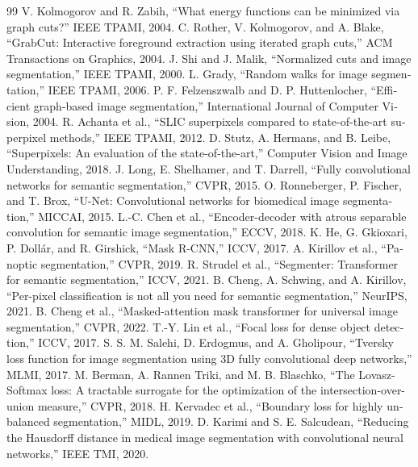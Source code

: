 \documentclass[12pt,openany,oneside]{book}
\begin{document}
\begin{latin}
\begin{thebibliography}{99}
 V. Kolmogorov and R. Zabih, ``What energy functions can be minimized via graph cuts?'' IEEE TPAMI, 2004.
 C. Rother, V. Kolmogorov, and A. Blake, ``GrabCut: Interactive foreground extraction using iterated graph cuts,'' ACM Transactions on Graphics, 2004.
 J. Shi and J. Malik, ``Normalized cuts and image segmentation,'' IEEE TPAMI, 2000.
 L. Grady, ``Random walks for image segmentation,'' IEEE TPAMI, 2006.
 P. F. Felzenszwalb and D. P. Huttenlocher, ``Efficient graph-based image segmentation,'' International Journal of Computer Vision, 2004.
 R. Achanta et al., ``SLIC superpixels compared to state-of-the-art superpixel methods,'' IEEE TPAMI, 2012.
 D. Stutz, A. Hermans, and B. Leibe, ``Superpixels: An evaluation of the state-of-the-art,'' Computer Vision and Image Understanding, 2018.
 J. Long, E. Shelhamer, and T. Darrell, ``Fully convolutional networks for semantic segmentation,'' CVPR, 2015.
 O. Ronneberger, P. Fischer, and T. Brox, ``U-Net: Convolutional networks for biomedical image segmentation,'' MICCAI, 2015.
 L.-C. Chen et al., ``Encoder-decoder with atrous separable convolution for semantic image segmentation,'' ECCV, 2018.
 K. He, G. Gkioxari, P. Dollár, and R. Girshick, ``Mask R-CNN,'' ICCV, 2017.
 A. Kirillov et al., ``Panoptic segmentation,'' CVPR, 2019.
 R. Strudel et al., ``Segmenter: Transformer for semantic segmentation,'' ICCV, 2021.
 B. Cheng, A. Schwing, and A. Kirillov, ``Per-pixel classification is not all you need for semantic segmentation,'' NeurIPS, 2021.
 B. Cheng et al., ``Masked-attention mask transformer for universal image segmentation,'' CVPR, 2022.
 T.-Y. Lin et al., ``Focal loss for dense object detection,'' ICCV, 2017.
 S. S. M. Salehi, D. Erdogmus, and A. Gholipour, ``Tversky loss function for image segmentation using 3D fully convolutional deep networks,'' MLMI, 2017.
 M. Berman, A. Rannen Triki, and M. B. Blaschko, ``The Lovasz-Softmax loss: A tractable surrogate for the optimization of the intersection-over-union measure,'' CVPR, 2018.
 H. Kervadec et al., ``Boundary loss for highly unbalanced segmentation,'' MIDL, 2019.
 D. Karimi and S. E. Salcudean, ``Reducing the Hausdorff distance in medical image segmentation with convolutional neural networks,'' IEEE TMI, 2020.

\end{thebibliography}
\end{latin}
\end{document}
